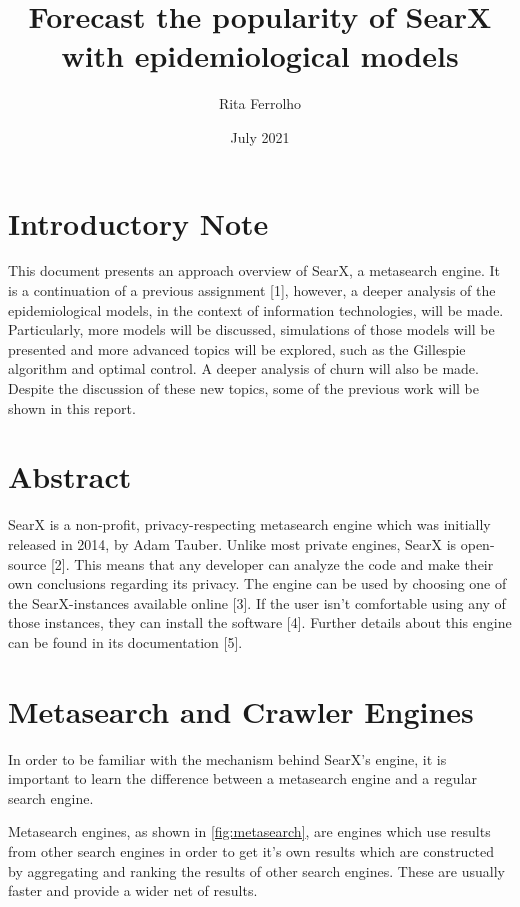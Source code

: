\documentclass{article}
\title{Forecast the popularity of SearX with epidemiological models}
\author{Rita Ferrolho }
\date{July 2021}
\begin{document}
\maketitle %
\tableofcontents %

\section*{Introductory Note}
This document presents an approach overview of SearX, a metasearch engine. It is a continuation of a previous assignment [1], however, a deeper analysis of the epidemiological models, in the context of information technologies, will be made. Particularly, more models will be discussed, simulations of those models will be presented and more advanced topics will be explored, such as the Gillespie algorithm and optimal control. A deeper analysis of churn will also be made. Despite the discussion of these new topics, some of the previous work will be shown in this report.



\section{Abstract} %
SearX is a non-profit, privacy-respecting metasearch engine which was initially released in 2014, by Adam Tauber. Unlike most private engines, SearX is open-source [2]. This means that any developer can analyze the code and make their own conclusions regarding its privacy. The engine can be used by choosing one of the SearX-instances available online [3]. If the user isn’t comfortable using any of those instances, they can install the software [4]. Further details about this engine can be found in its documentation [5].

\section{Metasearch and Crawler Engines}
In order to be familiar with the mechanism behind SearX’s engine, it is important to learn the difference between a metasearch engine and a regular search engine.

Metasearch engines, as shown in \autoref{fig:metasearch}, are engines which use results from other search engines in order to get it’s own results which are constructed by aggregating and ranking the results of other search engines. These are usually faster and provide a wider net of results.
\end{document}

